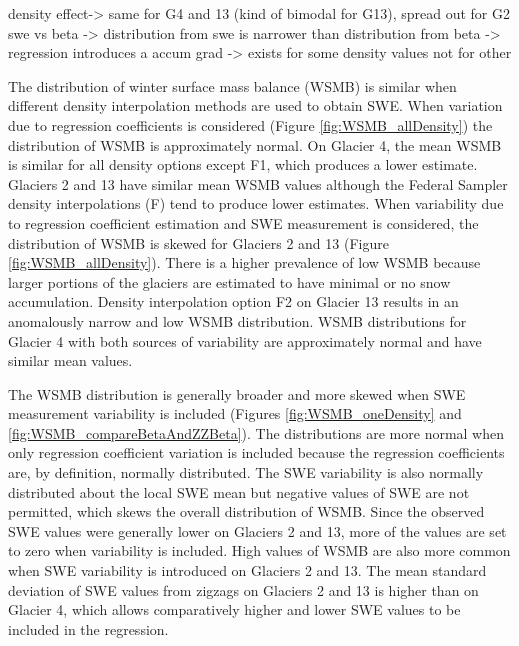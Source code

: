 \documentclass[12pt]{article}
\begin{document}
density effect-> same for G4 and 13 (kind of bimodal for G13), spread out for G2
swe vs beta -> distribution from swe is narrower than distribution from beta -> regression introduces a 
accum grad -> exists for some density values not for other



The distribution of winter surface mass balance (WSMB) is similar when different density interpolation methods are used to obtain SWE. When variation due to regression coefficients is considered (Figure \ref{fig:WSMB_allDensity}) the distribution of WSMB is approximately normal. On Glacier 4, the mean WSMB is similar for all density options except F1, which produces a lower estimate. Glaciers 2 and 13 have similar mean WSMB values although the Federal Sampler density interpolations (F) tend to produce lower estimates. When variability due to regression coefficient estimation and SWE measurement is considered, the distribution of WSMB is skewed for Glaciers 2 and 13 (Figure \ref{fig:WSMB_allDensity}). There is a higher prevalence of low WSMB because larger portions of the glaciers are estimated to have minimal or no snow accumulation. Density interpolation option F2 on Glacier 13 results in an anomalously narrow and low WSMB distribution. WSMB distributions for Glacier 4 with both sources of variability are approximately normal and have similar mean values. 

The WSMB distribution is generally broader and more skewed when SWE measurement variability is included (Figures \ref{fig:WSMB_oneDensity} and \ref{fig:WSMB_compareBetaAndZZBeta}). The distributions are more normal when only regression coefficient variation is included because the regression coefficients are, by definition, normally distributed. The SWE variability is also normally distributed about the local SWE mean but negative values of SWE are not permitted, which skews the overall distribution of WSMB. Since the observed SWE values were generally lower on Glaciers 2 and 13, more of the values are set to zero when variability is included.  High values of WSMB are also more common when SWE variability is introduced on Glaciers 2 and 13. The mean standard deviation of SWE values from zigzags on Glaciers 2 and 13 is higher than on Glacier 4, which allows comparatively higher and lower SWE values to be included in the regression. 
\end{document}
